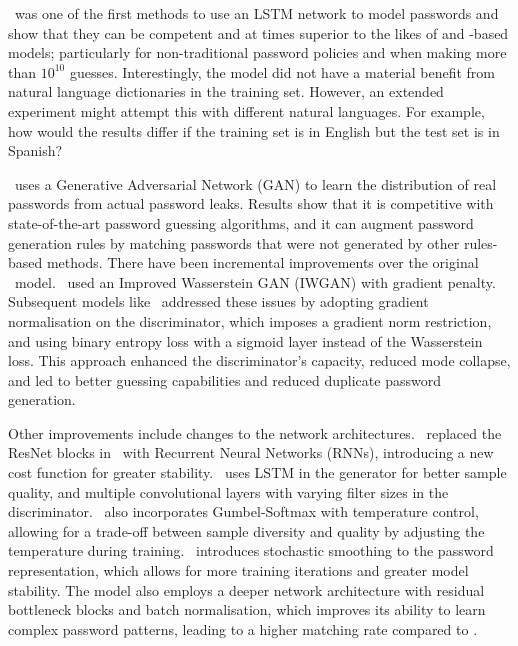 \fla\ was one of the first methods to use an LSTM network to model passwords and show that they can be competent and at times superior to the likes of \markovngramnocite and \pcfgnocite-based models; particularly for non-traditional password policies and when making more than $10^{10}$ guesses. Interestingly, the model did not have a material benefit from natural language dictionaries in the training set. However, an extended experiment might attempt this with different natural languages. For example, how would the results differ if the training set is in English but the test set is in Spanish?

\passgan\ uses a Generative Adversarial Network (GAN) to learn the distribution of real passwords from actual password leaks. Results show that it is competitive with state-of-the-art password guessing algorithms, and it can augment password generation rules by matching passwords that were not generated by other rules-based methods. There have been incremental improvements over the original \passgannocite\ model. \passgannocite\ used an Improved Wasserstein GAN (IWGAN) with gradient penalty. Subsequent models like \gnpassgan\ addressed these issues by adopting gradient normalisation on the discriminator, which imposes a gradient norm restriction, and using binary entropy loss with a sigmoid layer instead of the Wasserstein loss. This approach enhanced the discriminator's capacity, reduced mode collapse, and led to better guessing capabilities and reduced duplicate password generation.

Other improvements include changes to the network architectures. \redpack\ replaced the ResNet blocks in \passgannocite\ with Recurrent Neural Networks (RNNs), introducing a new cost function for greater stability. \gpass\ uses LSTM in the generator for better sample quality, and multiple convolutional layers with varying filter sizes in the discriminator. \gpassnocite\ also incorporates Gumbel-Softmax with temperature control, allowing for a trade-off between sample diversity and quality by adjusting the temperature during training. \cwaegan\ introduces stochastic smoothing to the password representation, which allows for more training iterations and greater model stability. The model also employs a deeper network architecture with residual bottleneck blocks and batch normalisation, which improves its ability to learn complex password patterns, leading to a higher matching rate compared to \passgannocite.


